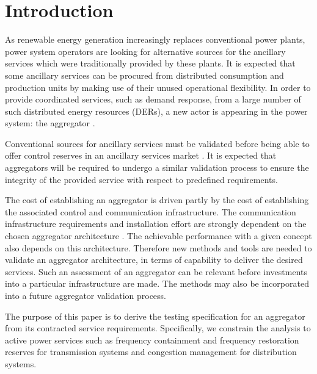 \section{Introduction}
As renewable energy generation increasingly replaces conventional power plants, power system operators are looking for alternative sources for the ancillary services which were traditionally provided by these plants. It is expected that some ancillary services can be procured from distributed consumption and production units by making use of their unused operational flexibility. In order to provide coordinated services, such as demand response, from a large number of such distributed energy resources (DERs), a new actor is appearing in the power system: the aggregator \cite{gkatzikis2013a}.%

Conventional sources for ancillary services must be %
validated before being able to offer control reserves in an ancillary services market \cite{energinettender}. It is expected that aggregators will be required to undergo a similar validation process to ensure the integrity of the provided service with respect to predefined requirements.

The cost of establishing an aggregator is driven partly by the cost of establishing the associated control and communication infrastructure. The communication infrastructure requirements and installation effort are strongly dependent on the chosen aggregator architecture \cite{kosek2013overview}. The achievable performance with a given concept also depends on this architecture. %
Therefore new methods and tools are needed to validate an aggregator architecture, in terms of capability to deliver the desired services. Such an assessment of an aggregator can be relevant before investments into a particular infrastructure are made. The methods may also be incorporated into a future aggregator validation process.

The purpose of this paper is to derive the testing specification for an aggregator from its contracted service requirements. Specifically, we constrain the analysis to active power services such as frequency containment and frequency restoration reserves \cite{entso1operational} for transmission systems and congestion management for distribution systems. %
